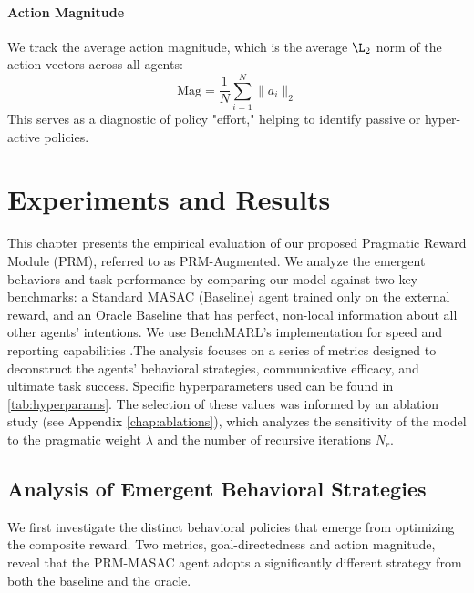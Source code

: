 \documentclass[12pt, a4paper]{report}
\begin{document}
\subsubsection{Action Magnitude}
We track the average action magnitude, which is the average $\L_2$ norm of the action vectors across all agents:
$$ \text{Mag} = \frac{1}{N} \sum_{i=1}^N \| a_i \|_2 $$
This serves as a diagnostic of policy "effort," helping to identify passive or hyper-active policies.

\chapter{Experiments and Results}
\label{chap:experiments_results}

This chapter presents the empirical evaluation of our proposed Pragmatic Reward Module (PRM), referred to as PRM-Augmented. We analyze the emergent behaviors and task performance by comparing our model against two key benchmarks: a Standard MASAC (Baseline) agent trained only on the external reward, and an Oracle Baseline that has perfect, non-local information about all other agents' intentions. We use BenchMARL's implementation for speed and reporting capabilities \cite{bettini2024benchmarl}.The analysis focuses on a series of metrics designed to deconstruct the agents' behavioral strategies, communicative efficacy, and ultimate task success. Specific hyperparameters used can be found in \ref{tab:hyperparams}. The selection of these values was informed by an ablation study (see Appendix \ref{chap:ablations}), which analyzes the sensitivity of the model to the pragmatic weight $\lambda$ and the number of recursive iterations $N_r$.

\section{Analysis of Emergent Behavioral Strategies}
\label{sec:results_behavior}

We first investigate the distinct behavioral policies that emerge from optimizing the composite reward. Two metrics, goal-directedness and action magnitude, reveal that the PRM-MASAC agent adopts a significantly different strategy from both the baseline and the oracle.
\end{document}
